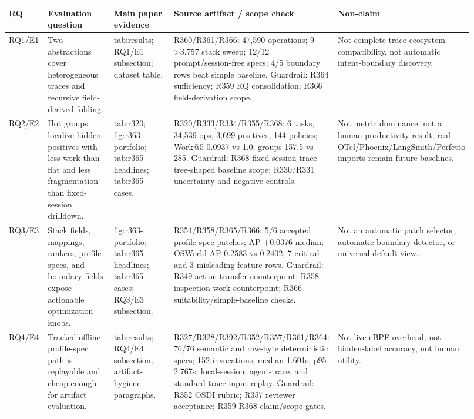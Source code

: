 \begin{tabular}{p{0.09\linewidth}p{0.22\linewidth}p{0.23\linewidth}p{0.22\linewidth}p{0.16\linewidth}}
  \toprule
  RQ & Evaluation question & Main paper evidence & Source artifact / scope check & Non-claim \\
  \midrule
  RQ1/E1 & Two abstractions cover heterogeneous traces and recursive field-derived folding. & tab:results; RQ1/E1 subsection; dataset table. & R360/R361/R366: 47,590 operations; 9->3,757 stack sweep; 12/12 prompt/session-free specs; 4/5 boundary rows beat simple baseline. Guardrail: R364 sufficiency; R359 RQ consolidation; R366 field-derivation scope. & Not complete trace-ecosystem compatibility, not automatic intent-boundary discovery. \\
  RQ2/E2 & Hot groups localize hidden positives with less work than flat and less fragmentation than fixed-session drilldown. & tab:r320; fig:r363-portfolio; tab:r365-headlines; tab:r365-cases. & R320/R333/R334/R355/R368: 6 tasks, 34,539 ops, 3,699 positives, 144 policies; Work@5 0.0937 vs 1.0; groups 157.5 vs 285. Guardrail: R368 fixed-session trace-tree-shaped baseline scope; R330/R331 uncertainty and negative controls. & Not metric dominance; not a human-productivity result; real OTel/Phoenix/LangSmith/Perfetto imports remain future baselines. \\
  RQ3/E3 & Stack fields, mappings, rankers, profile specs, and boundary fields expose actionable optimization knobs. & fig:r363-portfolio; tab:r365-headlines; tab:r365-cases; RQ3/E3 subsection. & R354/R358/R365/R366: 5/6 accepted profile-spec patches; AP +0.0376 median; OSWorld AP 0.2583 vs 0.2402; 7 critical and 3 misleading feature rows. Guardrail: R349 action-transfer counterpoint; R358 inspection-work counterpoint; R366 suitability/simple-baseline checks. & Not an automatic patch selector, automatic boundary detector, or universal default view. \\
  RQ4/E4 & Tracked offline profile-spec path is replayable and cheap enough for artifact evaluation. & tab:results; RQ4/E4 subsection; artifact-hygiene paragraphs. & R327/R328/R392/R352/R357/R361/R364: 76/76 semantic and raw-byte deterministic specs; 152 invocations; median 1.601s, p95 2.767s; local-session, agent-trace, and standard-trace input replay. Guardrail: R352 OSDI rubric; R357 reviewer acceptance; R359-R368 claim/scope gates. & Not live eBPF overhead, not hidden-label accuracy, not human utility. \\
  \bottomrule
\end{tabular}
